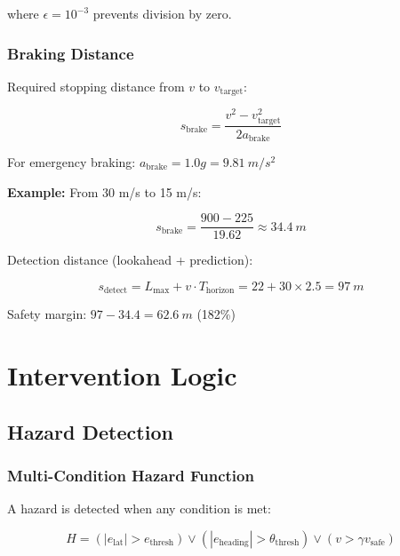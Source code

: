 \documentclass[11pt,a4paper]{article}
\begin{document}
where $\epsilon = 10^{-3}$ prevents division by zero.

\subsubsection{Braking Distance}

Required stopping distance from $v$ to $v_{\text{target}}$:

\begin{equation}
s_{\text{brake}} = \frac{v^2 - v_{\text{target}}^2}{2 a_{\text{brake}}}
\end{equation}

For emergency braking: $a_{\text{brake}} = 1.0g = \SI{9.81}{m/s^2}$

\textbf{Example:} From 30 m/s to 15 m/s:

\begin{equation}
s_{\text{brake}} = \frac{900 - 225}{19.62} \approx \SI{34.4}{m}
\end{equation}

Detection distance (lookahead + prediction):

\begin{equation}
s_{\text{detect}} = L_{\text{max}} + v \cdot T_{\text{horizon}} = 22 + 30 \times 2.5 = \SI{97}{m}
\end{equation}

Safety margin: $97 - 34.4 = \SI{62.6}{m}$ (182\%)

\section{Intervention Logic}

\subsection{Hazard Detection}

\subsubsection{Multi-Condition Hazard Function}

A hazard is detected when any condition is met:

\begin{equation}
H = (|e_{\text{lat}}| > e_{\text{thresh}}) \lor (|e_{\text{heading}}| > \theta_{\text{thresh}}) \lor (v > \gamma v_{\text{safe}})
\end{equation}
\end{document}
